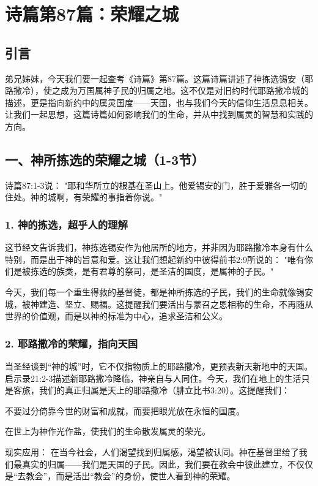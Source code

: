 \documentclass[a4paper, 12pt]{article}
\begin{document}
\section{诗篇第87篇：荣耀之城}

\subsection*{引言}
弟兄姊妹，今天我们要一起查考《诗篇》第87篇。这篇诗篇讲述了神拣选锡安（耶路撒冷），使之成为万国属神子民的归属之地。这不仅是对旧约时代耶路撒冷城的描述，更是指向新约中的属灵国度——天国，也与我们今天的信仰生活息息相关。让我们一起思想，这篇诗篇如何影响我们的生命，并从中找到属灵的智慧和实践的方向。

\subsection*{一、神所拣选的荣耀之城（1-3节）}
诗篇87:1-3说：
"耶和华所立的根基在圣山上。他爱锡安的门，胜于爱雅各一切的住处。神的城啊，有荣耀的事指着你说。"

\subsubsection*{1. 神的拣选，超乎人的理解}
\hspace{0.6cm}这节经文告诉我们，神拣选锡安作为他居所的地方，并非因为耶路撒冷本身有什么特别，而是出于神的旨意和爱。这让我们想起新约中彼得前书2:9所说的：
"唯有你们是被拣选的族类，是有君尊的祭司，是圣洁的国度，是属神的子民。"

今天，我们每一个重生得救的基督徒，都是神所拣选的子民，我们的生命就像锡安城，被神建造、坚立、赐福。这提醒我们要活出与蒙召之恩相称的生命，不再随从世界的价值观，而是以神的标准为中心，追求圣洁和公义。

\subsubsection*{2. 耶路撒冷的荣耀，指向天国}
\hspace{0.6cm}当圣经谈到“神的城”时，它不仅指物质上的耶路撒冷，更预表新天新地中的天国。启示录21:2-3描述新耶路撒冷降临，神亲自与人同住。今天，我们在地上的生活只是客旅，我们的真正归属是天上的耶路撒冷（腓立比书3:20）。这提醒我们：

不要过分倚靠今世的财富和成就，而要把眼光放在永恒的国度。

在世上为神作光作盐，使我们的生命散发属灵的荣光。

现实应用： 在当今社会，人们渴望找到归属感，渴望被认同。神在基督里给了我们最真实的归属——我们是天国的子民。因此，我们要在教会中彼此建立，不仅仅是“去教会”，而是活出“教会”的身份，使世人看到神的荣耀。
\end{document}
